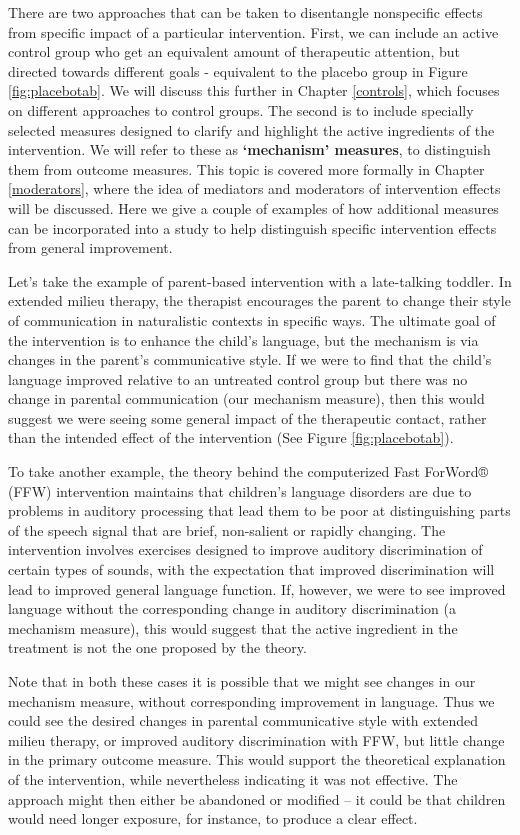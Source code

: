 \documentclass{krantz}
\begin{document}
There are two approaches that can be taken to disentangle nonspecific effects from specific impact of a particular intervention. First, we can include an active control group who get an equivalent amount of therapeutic attention, but directed towards different goals - equivalent to the placebo group in Figure \ref{fig:placebotab}. We will discuss this further in Chapter \ref{controls}, which focuses on different approaches to control groups. The second is to include specially selected measures designed to clarify and highlight the active ingredients of the intervention. We will refer to these as \textbf{`mechanism' measures}, to distinguish them from outcome measures. This topic is covered more formally in Chapter \ref{moderators}, where the idea of mediators and moderators of intervention effects will be discussed. Here we give a couple of examples of how additional measures can be incorporated into a study to help distinguish specific intervention effects from general improvement.

Let's take the example of parent-based intervention with a late-talking toddler. In extended milieu therapy, the therapist encourages the parent to change their style of communication in naturalistic contexts in specific ways. The ultimate goal of the intervention is to enhance the child's language, but the mechanism is via changes in the parent's communicative style. If we were to find that the child's language improved relative to an untreated control group but there was no change in parental communication (our mechanism measure), then this would suggest we were seeing some general impact of the therapeutic contact, rather than the intended effect of the intervention (See Figure \ref{fig:placebotab}).

To take another example, the theory behind the computerized Fast ForWord® (FFW) intervention maintains that children's language disorders are due to problems in auditory processing that lead them to be poor at distinguishing parts of the speech signal that are brief, non-salient or rapidly changing. The intervention involves exercises designed to improve auditory discrimination of certain types of sounds, with the expectation that improved discrimination will lead to improved general language function. If, however, we were to see improved language without the corresponding change in auditory discrimination (a mechanism measure), this would suggest that the active ingredient in the treatment is not the one proposed by the theory.

Note that in both these cases it is possible that we might see changes in our mechanism measure, without corresponding improvement in language. Thus we could see the desired changes in parental communicative style with extended milieu therapy, or improved auditory discrimination with FFW, but little change in the primary outcome measure. This would support the theoretical explanation of the intervention, while nevertheless indicating it was not effective. The approach might then either be abandoned or modified -- it could be that children would need longer exposure, for instance, to produce a clear effect.
\end{document}
